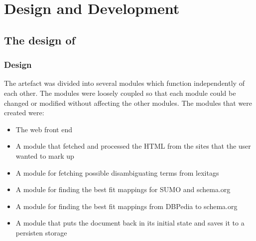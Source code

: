 
\chapter{Design and Development} %

\label{DesignAndDevelopment} %



\section{The design of \theartefact}

\subsection{Design}
The artefact was divided into several modules which function independently of each other.
The modules were loosely coupled so that each module could be changed or modified without affecting the other modules.
The modules that were created were:
\begin{itemize}
	\item The web front end
	\item A module that fetched and processed the HTML from the sites that the user wanted to mark up
	\item A module for fetching possible disambiguating terms from lexitags
	\item A module for finding the best fit mappings for SUMO and schema.org
	\item A module for finding the best fit mappings from DBPedia to schema.org
	\item A module that puts the document back in its initial state and saves it to a persisten storage
\end{itemize}

